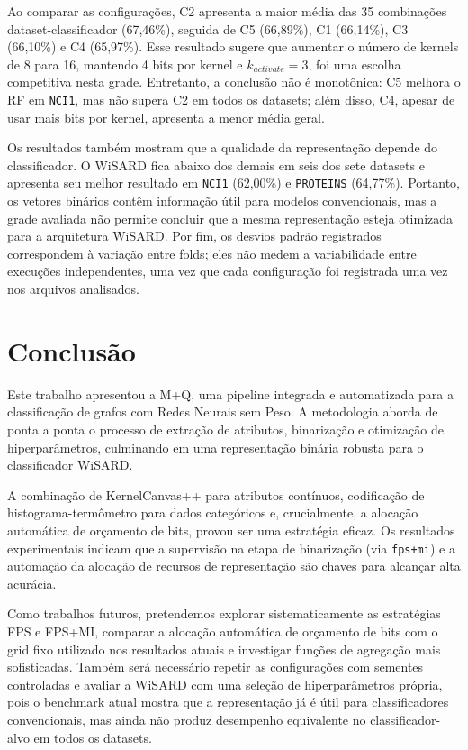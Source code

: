 \documentclass[12pt]{article}
\begin{document}
Ao comparar as configurações, C2 apresenta a maior média das 35 combinações dataset-classificador (67,46\%), seguida de C5 (66,89\%), C1 (66,14\%), C3 (66,10\%) e C4 (65,97\%). Esse resultado sugere que aumentar o número de kernels de 8 para 16, mantendo 4 bits por kernel e $k_{activate}=3$, foi uma escolha competitiva nesta grade. Entretanto, a conclusão não é monotônica: C5 melhora o RF em \texttt{NCI1}, mas não supera C2 em todos os datasets; além disso, C4, apesar de usar mais bits por kernel, apresenta a menor média geral.

Os resultados também mostram que a qualidade da representação depende do classificador. O WiSARD fica abaixo dos demais em seis dos sete datasets e apresenta seu melhor resultado em \texttt{NCI1} (62,00\%) e \texttt{PROTEINS} (64,77\%). Portanto, os vetores binários contêm informação útil para modelos convencionais, mas a grade avaliada não permite concluir que a mesma representação esteja otimizada para a arquitetura WiSARD. Por fim, os desvios padrão registrados correspondem à variação entre folds; eles não medem a variabilidade entre execuções independentes, uma vez que cada configuração foi registrada uma vez nos arquivos analisados.

\section{Conclusão}

Este trabalho apresentou a M+Q, uma pipeline integrada e automatizada para a classificação de grafos com Redes Neurais sem Peso. A metodologia aborda de ponta a ponta o processo de extração de atributos, binarização e otimização de hiperparâmetros, culminando em uma representação binária robusta para o classificador WiSARD.

A combinação de KernelCanvas++ para atributos contínuos, codificação de histograma-termômetro para dados categóricos e, crucialmente, a alocação automática de orçamento de bits, provou ser uma estratégia eficaz. Os resultados experimentais indicam que a supervisão na etapa de binarização (via \texttt{fps+mi}) e a automação da alocação de recursos de representação são chaves para alcançar alta acurácia.

Como trabalhos futuros, pretendemos explorar sistematicamente as estratégias FPS e FPS+MI, comparar a alocação automática de orçamento de bits com o grid fixo utilizado nos resultados atuais e investigar funções de agregação mais sofisticadas. Também será necessário repetir as configurações com sementes controladas e avaliar a WiSARD com uma seleção de hiperparâmetros própria, pois o benchmark atual mostra que a representação já é útil para classificadores convencionais, mas ainda não produz desempenho equivalente no classificador-alvo em todos os datasets.


\end{document}
